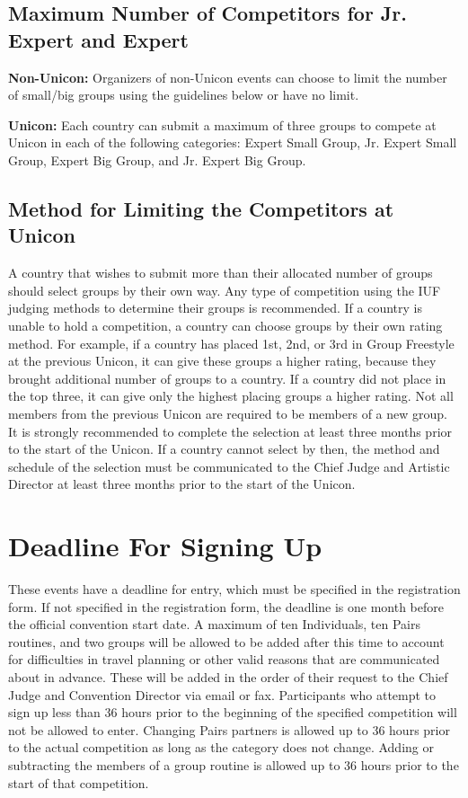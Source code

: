 \subsection{Maximum Number of Competitors for Jr. Expert and Expert}
\textbf{Non-Unicon:} Organizers of non-Unicon events can choose to limit the number of small/big groups using the guidelines below or have no limit.

\textbf{Unicon:} Each country can submit a maximum of three groups to compete at Unicon in each of the following categories: Expert Small Group, Jr. Expert Small Group, Expert Big Group, and Jr. Expert Big Group.

\subsection{Method for Limiting the Competitors at Unicon}
A country that wishes to submit more than their allocated number of groups should select groups by their own way.
Any type of competition using the IUF judging methods to determine their groups is recommended.
If a country is unable to hold a competition, a country can choose groups by their own rating method.
For example, if a country has placed 1st, 2nd, or 3rd in Group Freestyle at the previous Unicon, it can give these groups a higher rating, because they brought additional number of groups to a country.
If a country did not place in the top three, it can give only the highest placing groups a higher rating.
Not all members from the previous Unicon are required to be members of a new group.
It is strongly recommended to complete the selection at least three months prior to the start of the Unicon.
If a country cannot select by then, the method and schedule of the selection must be communicated to the Chief Judge and Artistic Director at least three months prior to the start of the Unicon.

\section{Deadline For Signing Up}
These events have a deadline for entry, which must be specified in the registration form.
If not specified in the registration form, the deadline is one month before the official convention start date.
A maximum of ten Individuals, ten Pairs routines, and two groups will be allowed to be added after this time to account for difficulties in travel planning or other valid reasons that are communicated about in advance.
These will be added in the order of their request to the Chief Judge and Convention Director via email or fax.
Participants who attempt to sign up less than 36 hours prior to the beginning of the specified competition will not be allowed to enter.
Changing Pairs partners is allowed up to 36 hours prior to the actual competition as long as the category does not change.
Adding or subtracting the members of a group routine is allowed up to 36 hours prior to the start of that competition.

